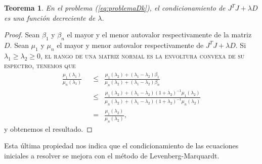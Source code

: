 \documentclass[11pt,a4paper]{book}
\newtheorem{theorem}{Teorema}[chapter]
\theoremstyle{definition}
\theoremstyle{remark}
\begin{document}
\begin{theorem}
	En el problema (\ref{eq:problemaDk}), el condicionamiento de $J^TJ+\lambda D$ es una función decreciente de $\lambda$.
\end{theorem}
\begin{proof}
	Sean $\beta_1$ y $\beta_n$ el mayor y el menor autovalor respectivamente de la matriz $D$. Sean $\mu_1$ y $\mu_n$ el mayor y menor autovalor respectivamente de $J^TJ+\lambda D$. Si $\lambda_1 \geq \lambda_2 \geq 0$, \textsc{el rango de una matriz normal es la envoltura convexa de su espectro, tenemos que}
\begin{equation}
\begin{split}
\frac{\mu_1(\lambda_1)}{\mu_n(\lambda_1)}\enspace
	&\leq\enspace \frac{\mu_1(\lambda_2)+(\lambda_1-\lambda_2)\beta_1} 					{\mu_n(\lambda_2)+(\lambda_1-\lambda_2)\beta_n} \\
	&\leq\enspace \frac{\mu_1(\lambda_2)+
				(\lambda_1-\lambda_2)(1+\lambda_2)^{-1}\mu_1(\lambda_2)} 					{\mu_n(\lambda_2)+
				(\lambda_1-\lambda_2)(1+\lambda_2)^{-1}\mu_n(\lambda_2)} \\
	&=\enspace \frac{\mu_1(\lambda_2)}{\mu_n(\lambda_2)},
\end{split}
\end{equation}
y obtenemos el resultado.
\end{proof}
Esta última propiedad nos indica que el condicionamiento de las ecuaciones iniciales a resolver se mejora con el método de Levenberg-Marquardt.
\end{document}

